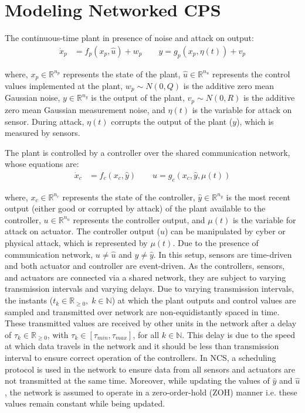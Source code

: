 \section{Modeling Networked CPS}

The continuous-time plant in presence of noise and attack on output:
\begin{align}
    \dot{x}_p &= f_p(x_p, \hat{u}) + w_p \qquad y = g_p(x_p, \eta (t)) + v_p 
\end{align}

where, $x_p \in \mathbb{R}^{n_p}$ represents the state of the plant, $\hat{u} \in \mathbb{R}^{n_u}$ represents the control values implemented at the plant, $w_p \sim N(0, Q)$ is the additive zero mean Gaussian noise, $y \in \mathbb{R}^{n_y}$ is the output of the plant, $v_p \sim N(0, R)$ is the additive zero mean Gaussian measurement noise, and $\eta (t)$ is the variable for attack on sensor. During attack, $\eta (t)$ corrupts the output of the plant ($y$), which is measured by sensors. 


The plant is controlled by a controller over the shared communication network, whose equations are:
\begin{align}
    \dot{x}_c &= f_c(x_c, \hat{y}) \qquad u = g_c(x_c, \hat{y}, \mu (t)) 
\end{align}

where, $x_c \in \mathbb{R}^{n_c}$ represents the state of the controller,  $\hat{y} \in \mathbb{R}^{n_y}$ is the most recent output (either good or corrupted by attack) of the plant available to the controller, $u \in \mathbb{R}^{n_u}$ represents the controller output, and $\mu (t)$ is the variable for attack on actuator. The controller output ($u$) can be manipulated by cyber or physical attack, which is represented by $\mu (t)$. Due to the presence of communication network, $u \neq \hat{u}$ and $y \neq \hat{y}$. In this setup, sensors are time-driven and both actuator and controller are event-driven. As the controllers, sensors, and actuators are connected via a shared network, they are subject to varying transmission intervals and varying delays. Due to varying transmission intervals, the instants ($t_k \in \mathbb{R}_{\geq 0}, \; k \in \mathbb{N}$) at which the plant outputs and control values are sampled and transmitted over network are non-equidistantly spaced in time. These transmitted values are received by other units in the network after a delay of $\tau_k \in \mathbb{R}_{\geq 0}$, with $\tau_k \in [\tau_{min}, \tau_{max}]$, for all $k \in \mathbb{N}$. This delay is due to the speed at which data travels in the network and it should be less than transmission interval to ensure correct operation of the controllers. In NCS, a scheduling protocol is used in the network to ensure data from all sensors and actuators are not transmitted at the same time. Moreover, while updating the values of $\hat{y}$ and $\hat{u}$, the network is assumed to operate in a zero-order-hold (ZOH) manner i.e. these values remain constant while being updated. 


